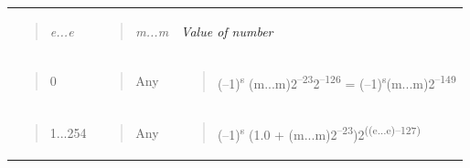 \begin{longtable}[]{@{}lll@{}}
\toprule
\endhead
\begin{minipage}[t]{0.30\columnwidth}\raggedright
\begin{quote}
\emph{e...e}
\end{quote}\strut
\end{minipage} & \begin{minipage}[t]{0.30\columnwidth}\raggedright
\begin{quote}
\emph{m...m}
\end{quote}\strut
\end{minipage} & \begin{minipage}[t]{0.30\columnwidth}\raggedright
\emph{Value of number}\strut
\end{minipage}\tabularnewline
\begin{minipage}[t]{0.30\columnwidth}\raggedright
\begin{quote}
0
\end{quote}\strut
\end{minipage} & \begin{minipage}[t]{0.30\columnwidth}\raggedright
\begin{quote}
Any
\end{quote}\strut
\end{minipage} & \begin{minipage}[t]{0.30\columnwidth}\raggedright
\begin{quote}
(--1)\textsuperscript{s} (m...m)2\textsuperscript{--23}2\textsuperscript{--126} = (--1)\textsuperscript{s}(m...m)2\textsuperscript{--149}
\end{quote}\strut
\end{minipage}\tabularnewline
\begin{minipage}[t]{0.30\columnwidth}\raggedright
\begin{quote}
1...254
\end{quote}\strut
\end{minipage} & \begin{minipage}[t]{0.30\columnwidth}\raggedright
\begin{quote}
Any
\end{quote}\strut
\end{minipage} & \begin{minipage}[t]{0.30\columnwidth}\raggedright
\begin{quote}
(--1)\textsuperscript{s} (1.0 + (m...m)2\textsuperscript{--23})2\textsuperscript{((e...e)--127)}
\end{quote}\strut
\end{minipage}\tabularnewline

\end{longtable}
